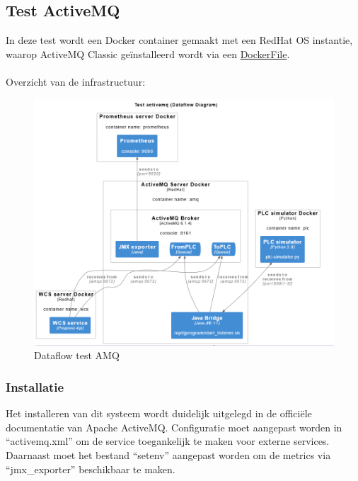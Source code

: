 \subsection{Test ActiveMQ}
In deze test wordt een Docker container gemaakt met een RedHat OS instantie, waarop ActiveMQ Classic 
geïnstalleerd wordt via een \hyperref[sec:codeamq]{DockerFile}.
\\\\
Overzicht van de infrastructuur:
\begin{figure}[h!]
  \centering
  \includegraphics[width=.9\textwidth]{img/test_amq_dataflow.png}
  \caption{\label{fig:test_amq_dataflow}Dataflow test AMQ}
\end{figure}

\subsubsection{Installatie}
Het installeren van dit systeem wordt duidelijk uitgelegd in de officiële documentatie van Apache ActiveMQ.
Configuratie moet aangepast worden in ``activemq.xml'' om de service toegankelijk te maken voor externe services.
Daarnaast moet het bestand ``setenv'' aangepast worden om de metrics via ``jmx\_exporter'' beschikbaar te maken.

